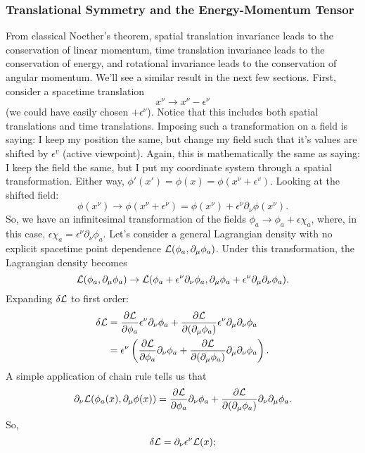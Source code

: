 \subsubsection{Translational Symmetry and the Energy-Momentum Tensor}
From classical Noether's theorem, spatial translation invariance leads to the conservation of linear momentum, time translation invariance leads to the conservation of energy, and rotational invariance leads to the conservation of angular momentum. We'll see a similar result in the next few sections. First, consider a spacetime translation
\[
    x^\nu \rightarrow x^\nu - \epsilon^\nu
\]
(we could have easily chosen $+\epsilon^\nu$). Notice that this includes both spatial translations and time translations. Imposing such a transformation on a field is saying: I keep my position the same, but change my field such that it's values are shifted by $\epsilon^v$ (active viewpoint). Again, this is mathematically the same as saying: I keep the field the same, but I put my coordinate system through a spatial transformation. Either way, $\phi'(x') = \phi(x) = \phi(x^\nu + \epsilon^v)$. Looking at the shifted field:
\[
    \phi(x^\nu)\rightarrow\phi(x^\nu+\epsilon^\nu) = \phi(x^\nu) + \epsilon^\nu\partial_\nu\phi(x^\nu).
\]
So, we have an infinitesimal transformation of the fields $\phi_a\rightarrow \phi_a + \epsilon\chi_a$, where, in this case, $\epsilon\chi_a = \epsilon^\nu\partial_\nu\phi_a$. Let's consider a general Lagrangian density with no explicit spacetime point dependence $\mathcal{L}(\phi_a, \partial_\mu\phi_a)$. Under this transformation, the Lagrangian density becomes
\[ 
    \mathcal{L}(\phi_a, \partial_\mu\phi_a) \rightarrow \mathcal{L}(\phi_a + \epsilon^\nu\partial_\nu\phi_a, \partial_\mu\phi_a + \epsilon^\nu\partial_\mu\partial_\nu\phi_a).
\]
Expanding $\delta\mathcal{L}$ to first order:
\begin{align*}
    \delta\mathcal{L} &= \frac{\partial\mathcal{L}}{\partial\phi_a}\epsilon^\nu\partial_\nu\phi_a + \frac{\partial\mathcal{L}}{\partial(\partial_\mu\phi_a)}\epsilon^\nu\partial_\mu\partial_\nu\phi_a\\
    & = \epsilon^\nu\left(\frac{\partial\mathcal{L}}{\partial\phi_a}\partial_\nu\phi_a + \frac{\partial\mathcal{L}}{\partial(\partial_\mu\phi_a)}\partial_\mu\partial_\nu\phi_a\right).
\end{align*}
A simple application of chain rule tells us that
\[
    \partial_\nu\mathcal{L}(\phi_a(x), \partial_\mu\phi(x)) = \frac{\partial\mathcal{L}}{\partial\phi_a}\partial_\nu\phi_a + \frac{\partial\mathcal{L}}{\partial(\partial_\mu\phi_a)}\partial_\nu\partial_\mu\phi_a.
\]
So,
\[
    \delta\mathcal{L} = \partial_\nu\epsilon^\nu\mathcal{L}(x);
\]
